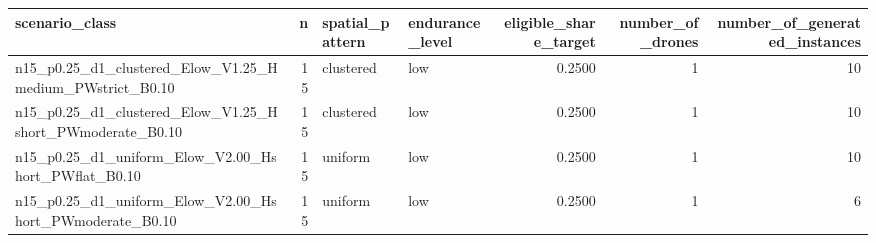 \begin{tabular}{lrllrrr}
\toprule
scenario_class & n & spatial_pattern & endurance_level & eligible_share_target & number_of_drones & number_of_generated_instances \\
\midrule
n15_p0.25_d1_clustered_Elow_V1.25_Hmedium_PWstrict_B0.10 & 15 & clustered & low & 0.2500 & 1 & 10 \\
n15_p0.25_d1_clustered_Elow_V1.25_Hshort_PWmoderate_B0.10 & 15 & clustered & low & 0.2500 & 1 & 10 \\
n15_p0.25_d1_uniform_Elow_V2.00_Hshort_PWflat_B0.10 & 15 & uniform & low & 0.2500 & 1 & 10 \\
n15_p0.25_d1_uniform_Elow_V2.00_Hshort_PWmoderate_B0.10 & 15 & uniform & low & 0.2500 & 1 & 6 \\
\bottomrule
\end{tabular}
